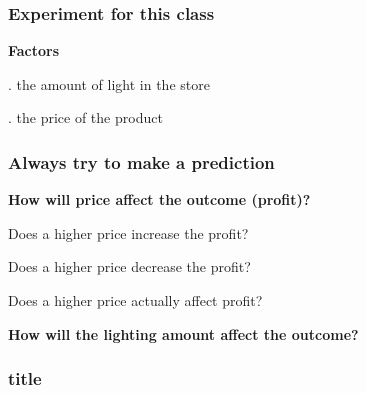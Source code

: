 \begin{frame}\frametitle{Experiment for this class}
	
	{\LARGE\textbf{{\color{purple} Factors}}}
	
	\vspace{24pt}
		. the amount of light in the store
		
	\vspace{12pt}
	
		\pause
		. the price of the product
	
\end{frame}

\begin{frame}\frametitle{Always try to make a prediction}
	
	{\LARGE\textbf{{\color{purple} How will price affect the outcome (profit)?}}}
	\pause
	
	\vspace{24pt}
		\qquad Does a higher price increase the profit?
		\pause
	
	\vspace{12pt}	
		\qquad Does a higher price decrease the profit?
		
		\pause
		
	\vspace{12pt}
		\qquad Does a higher price actually affect profit?
		
		\pause
		
	\vspace{24pt}
	\pause
	
	{\LARGE\textbf{{\color{purple} How will the lighting amount affect the outcome?}}}
\end{frame}

\begin{frame}\frametitle{title}
	
\end{frame}

